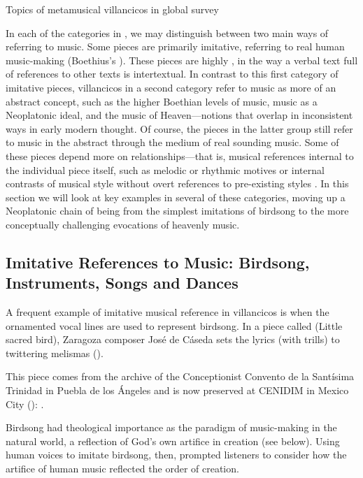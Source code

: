 
{Topics of metamusical villancicos in global survey}

In each of the categories in , we may distinguish between two
main ways of referring to music.  
Some pieces are primarily imitative, referring to real human music-making
(Boethius's ).
These pieces are highly , in the way a verbal text full of
references to other texts is intertextual.
In contrast to this first category of imitative pieces, villancicos in a second
category refer to music as more of an abstract concept, such as the higher
Boethian levels of music, music as a Neoplatonic ideal, and the music of
Heaven---notions that overlap in inconsistent ways in early modern thought.
Of course, the pieces in the latter group still refer to music in the abstract
through the medium of real sounding music.  
Some of these pieces depend more on  relationships---that
is, musical references internal to the individual piece itself, such as melodic
or rhythmic motives or internal contrasts of musical style without overt
references to pre-existing styles .
In this section we will look at key examples in several of these categories,
moving up a Neoplatonic chain of being from the simplest imitations of birdsong
to the more conceptually challenging evocations of heavenly music.


\subsection{Imitative References to Music: Birdsong, Instruments, Songs and
Dances}

A frequent example of imitative musical reference in villancicos is when the
ornamented vocal lines are used to represent birdsong.%
    \Autocite[295--301]{Illari:Polychoral}
In a piece called  (Little sacred bird), Zaragoza
composer José de Cáseda sets the lyrics  (with trills) to
twittering melismas ().%
\begin{Footnote} 
    This piece comes from the archive of the Conceptionist Convento de la
    Santísima Trinidad in Puebla de los Ángeles and is now preserved at CENIDIM
    in Mexico City (): 
    \autocite{Tello:SanchezGarzaCatalogo}.
\end{Footnote}
Birdsong had theological importance as the paradigm of music-making in the
natural world, a reflection of God's own artifice in creation (see below).
Using human voices to imitate birdsong, then, prompted listeners to consider
how the artifice of human music reflected the order of creation.

